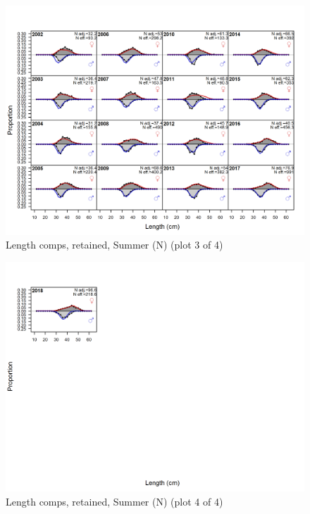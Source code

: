 \documentclass[12pt,]{article}
\begin{document}
\begin{figure}
\centering
\includegraphics{r4ss/plots_mod1/comp_lenfit_flt2mkt2_page3.png}
\caption{Length comps, retained, Summer (N) (plot 3 of 4)
\label{fig:length_fits}}
\end{figure}

\begin{figure}
\centering
\includegraphics{r4ss/plots_mod1/comp_lenfit_flt2mkt2_page4.png}
\caption{Length comps, retained, Summer (N) (plot 4 of 4)
\label{fig:length_fits}}
\end{figure}
\end{document}
